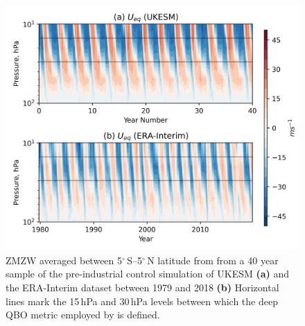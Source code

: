 \documentclass[wcd, manuscript]{copernicus}
\begin{document}
\begin{center}
\begin{figure}[h!]
\noindent\includegraphics[width = 0.8\linewidth]{figures/QBOs.png}
\caption{ZMZW averaged between 5$^{\circ}$\,S--5$^{\circ}$\,N latitude from from a 40 year sample of the pre-industrial control simulation of UKESM \textbf{(a)} and the ERA-Interim dataset between 1979 and 2018 \textbf{(b)} Horizontal lines mark the 15\,hPa and 30\,hPa levels between which the deep QBO metric employed by \cite{Andrews2019} is defined.}
\label{fig1}
\end{figure}
\end{center}


\end{document}
